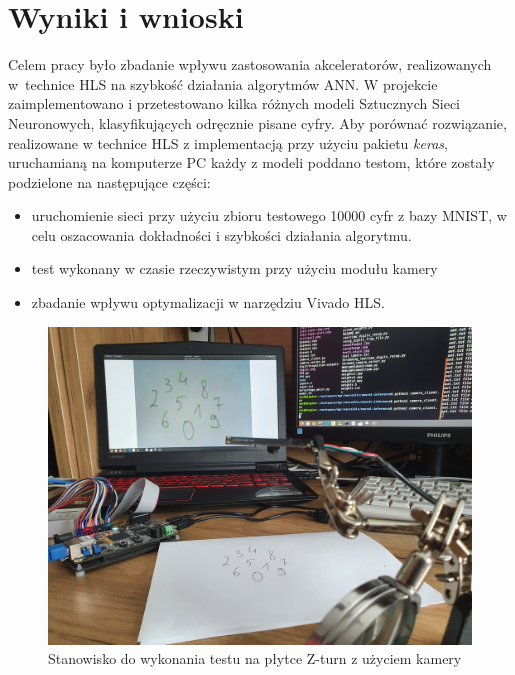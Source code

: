 \newpage %
\cleardoublepage %
\pagestyle{headings}

\section{Wyniki i wnioski}
Celem pracy było zbadanie wpływu zastosowania akceleratorów, realizowanych w~technice HLS na szybkość działania algorytmów ANN.
W projekcie zaimplementowano i przetestowano kilka różnych modeli Sztucznych Sieci Neuronowych, klasyfikujących odręcznie pisane cyfry. Aby porównać rozwiązanie, realizowane w technice HLS z implementacją przy użyciu pakietu \emph{keras}, uruchamianą na komputerze PC każdy z modeli poddano testom, które zostały podzielone na następujące części:
\begin{itemize}
  \item uruchomienie sieci przy użyciu zbioru testowego 10000 cyfr z bazy MNIST, w celu oszacowania dokładności i 
  szybkości działania algorytmu.
  \item test wykonany w czasie rzeczywistym przy użyciu modułu kamery
  \item zbadanie wpływu optymalizacji w narzędziu Vivado HLS.
\end{itemize}

\begin{figure}[!h]
  \centering
  \includegraphics[width=\textwidth]{img/stanowisko.jpg}
  \caption{Stanowisko do wykonania testu na płytce Z-turn z użyciem kamery}
  \label{stanowisko}
\end{figure}


